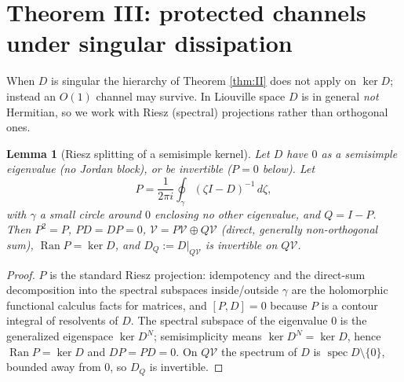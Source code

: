 \documentclass[11pt]{article}
\newtheorem{lemma}{Lemma}
\newcommand{\Ran}{\operatorname{Ran}}
\begin{document}
\section{Theorem III: protected channels under singular dissipation}

When $D$ is singular the hierarchy of Theorem \ref{thm:II} does not apply on
$\ker D$; instead an $O(1)$ channel may survive. In Liouville space $D$ is in
general \emph{not} Hermitian, so we work with Riesz (spectral) projections
rather than orthogonal ones.

\begin{lemma}[Riesz splitting of a semisimple kernel]
\label{lem:riesz}
Let $D$ have $0$ as a semisimple eigenvalue (no Jordan block), or be
invertible ($P=0$ below). Let
\[
P=\frac1{2\pi i}\oint_{\gamma}(\zeta I-D)^{-1}\,d\zeta ,
\]
with $\gamma$ a small circle around $0$ enclosing no other eigenvalue, and
$Q=I-P$. Then $P^2=P$, $PD=DP=0$, $\mathcal V=P\mathcal V\oplus Q\mathcal V$
(direct, generally non-orthogonal sum), $\Ran P=\ker D$, and
$D_Q:=D|_{Q\mathcal V}$ is invertible on $Q\mathcal V$.
\end{lemma}

\begin{proof}
$P$ is the standard Riesz projection: idempotency and the direct-sum
decomposition into the spectral subspaces inside/outside $\gamma$ are the
holomorphic functional calculus facts for matrices, and $[P,D]=0$ because $P$
is a contour integral of resolvents of $D$. The spectral subspace of the
eigenvalue $0$ is the generalized eigenspace $\ker D^{N}$; semisimplicity
means $\ker D^{N}=\ker D$, hence $\Ran P=\ker D$ and $DP=PD=0$. On
$Q\mathcal V$ the spectrum of $D$ is $\operatorname{spec}D\setminus\{0\}$,
bounded away from $0$, so $D_Q$ is invertible.
\end{proof}
\end{document}
